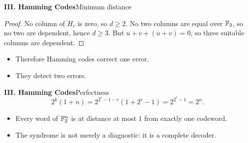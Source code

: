 \begin{frame}{\textbf{III. Hamming Codes}}{Minimum distance}
\small
{}
\begin{proof}
No column of $H_r$ is zero, so $d\ge2$. No two columns are equal over $\mathbb{F}_2$, so no two are dependent, hence $d\ge3$. But $u+v+(u+v)=0$, so three suitable columns are dependent.
\end{proof}
\begin{itemize}
  \item Therefore Hamming codes correct one error.
  \item They detect two errors.
\end{itemize}
\end{frame}

\begin{frame}{\textbf{III. Hamming Codes}}{Perfectness}
\small
{}
\[
  2^k(1+n)=2^{2^r-1-r}(1+2^r-1)=2^{2^r-1}=2^n.
\]
\begin{itemize}
  \item Every word of $\mathbb{F}_2^n$ is at distance at most $1$ from exactly one codeword.
  \item The syndrome is not merely a diagnostic: it is a complete decoder.
\end{itemize}
\end{frame}

